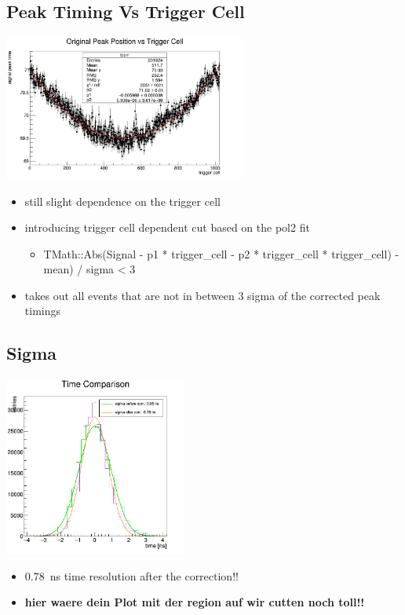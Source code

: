 \documentclass[9pt]{beamer}
\begin{document}
\subsection{Peak Timing Vs Trigger Cell}
\begin{frame}
	\begin{center}
		\includegraphics[width=8cm]{PeakTimeVsTrigCell}
	\end{center}
	\begin{itemize}
		\item still slight dependence on the trigger cell
		\item introducing trigger cell dependent cut based on the pol2 fit
		\begin{itemize}
			\item TMath::Abs(Signal - p1 * trigger\_cell - p2 * trigger\_cell * trigger\_cell) - mean) / sigma < 3
		\end{itemize}
		\item takes out all events that are not in between $3$ sigma of the corrected peak timings
	\end{itemize}
\end{frame}
\subsection{Sigma}
\begin{frame}
	\begin{center}
		\includegraphics[width=6cm]{TimeComparison.png}
	\end{center}
	\begin{itemize}
		\item \SI{0.78}{ns} time resolution after the correction!!
		\item \textbf{hier waere dein Plot mit der region auf wir cutten noch toll!!}
	\end{itemize}
\end{frame}
\end{document}
